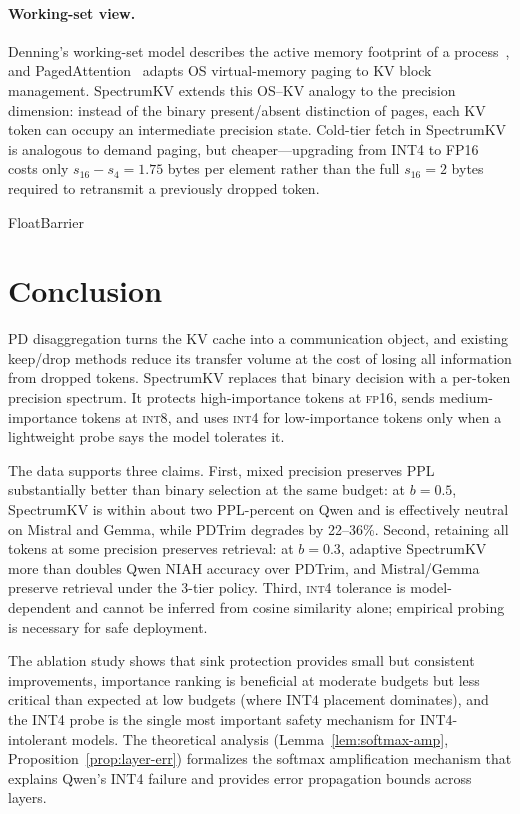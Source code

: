 \documentclass[11pt]{article}
\newcommand{\method}{SpectrumKV}
\newcommand{\niah}{NIAH}
\newcommand{\budget}{b}
\newcommand{\pct}{\%}
\newcommand{\fp}{\textsc{fp16}}
\newcommand{\intviii}{\textsc{int8}}
\newcommand{\intiv}{\textsc{int4}}
\theoremstyle{plain}
\theoremstyle{definition}
\begin{document}
\paragraph{Working-set view.}
Denning's working-set model describes the active memory footprint of a process~\citep{denning1968working}, and PagedAttention~\citep{pagedattention} adapts OS virtual-memory paging to KV block management.  \method{} extends this OS--KV analogy to the precision dimension: instead of the binary present/absent distinction of pages, each KV token can occupy an intermediate precision state.  Cold-tier fetch in \method{} is analogous to demand paging, but cheaper---upgrading from INT4 to FP16 costs only $s_{16}-s_4=1.75$ bytes per element rather than the full $s_{16}=2$ bytes required to retransmit a previously dropped token.

FloatBarrier
\section{Conclusion}
\label{sec:conclusion}

PD disaggregation turns the KV cache into a communication object, and existing keep/drop methods reduce its transfer volume at the cost of losing all information from dropped tokens.  \method{} replaces that binary decision with a per-token precision spectrum.  It protects high-importance tokens at \fp{}, sends medium-importance tokens at \intviii{}, and uses \intiv{} for low-importance tokens only when a lightweight probe says the model tolerates it.

The data supports three claims.  First, mixed precision preserves PPL substantially better than binary selection at the same budget: at $\budget=0.5$, \method{} is within about two PPL-percent on Qwen and is effectively neutral on Mistral and Gemma, while PDTrim degrades by 22--36\pct{}.  Second, retaining all tokens at some precision preserves retrieval: at $\budget=0.3$, adaptive \method{} more than doubles Qwen \niah{} accuracy over PDTrim, and Mistral/Gemma preserve retrieval under the 3-tier policy.  Third, \intiv{} tolerance is model-dependent and cannot be inferred from cosine similarity alone; empirical probing is necessary for safe deployment.

The ablation study shows that sink protection provides small but consistent improvements, importance ranking is beneficial at moderate budgets but less critical than expected at low budgets (where INT4 placement dominates), and the INT4 probe is the single most important safety mechanism for INT4-intolerant models.  The theoretical analysis (Lemma~\ref{lem:softmax-amp}, Proposition~\ref{prop:layer-err}) formalizes the softmax amplification mechanism that explains Qwen's INT4 failure and provides error propagation bounds across layers.
\end{document}
